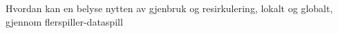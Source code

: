 Hvordan kan en belyse nytten av gjenbruk og resirkulering,
lokalt og globalt, gjennom flerspiller-dataspill
